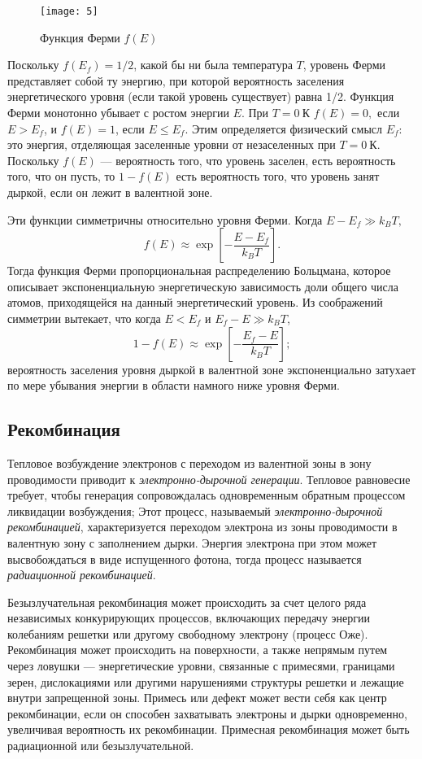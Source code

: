 \documentclass[a4paper, 12pt]{article}
\begin{document}
\begin{figure}[H]
    \texttt{[image: 5]} 
    \caption{Функция Ферми $f(E)$}
    \label{fig:5}
\end{figure}

Поскольку $f(E_{f}) = 1/2$, какой бы ни была температура $T$, уровень
Ферми представляет собой ту энергию, при которой вероятность заселения
энергетического уровня (если такой уровень существует) равна 1/2.
Функция Ферми монотонно убывает с ростом энергии $E$. При $T=0\: К$ 
$f(E)=0,$ если $E>E_{f}$, и $f(E)=1$, если $E\le E_{f}$. Этим
определяется физический смысл $E_{f}:$ это энергия, отделяющая
заселенные уровни от незаселенных при $T=0\: К$. Поскольку $f(E)$ ---
вероятность того, что уровень заселен, есть вероятность того, что он
пусть, то $1-f(E)$ есть вероятность того, что уровень занят дыркой,
если он лежит в валентной зоне. 

Эти функции симметричны относительно уровня Ферми. Когда $E-E_{f}\gg
k_{B}T,$
\[
    f(E)\approx \exp \left[- \frac{E-E_{f}}{k_{B}T}\right].
\]
Тогда функция Ферми пропорциональная распределению Больцмана, которое
описывает экспоненциальную энергетическую зависимость доли общего
числа атомов, приходящейся на данный энергетический уровень. Из
соображений симметрии вытекает, что когда $E<E_{f}$ и $E_{f}-E \gg
k_{B}T$,
\[
    1-f(E) \approx \exp \left[- \frac{E_{f}-E}{k_{B}T}\right];
\]
вероятность заселения уровня дыркой в валентной зоне экспоненциально
затухает по мере убывания энергии в области намного ниже уровня Ферми.

\subsection{Рекомбинация}
Тепловое возбуждение электронов с переходом из валентной зоны в зону
проводимости приводит к \emph{электронно-дырочной генерации}. Тепловое
равновесие требует, чтобы генерация сопровождалась одновременным
обратным процессом ликвидации возбуждения; Этот процесс, называемый
\emph{электронно-дырочной рекомбинацией}, характеризуется переходом
электрона из зоны проводимости в валентную зону с заполнением дырки.
Энергия электрона при этом может высвобождаться в виде испущенного
фотона, тогда процесс называется \emph{радиационной
рекомбинацией}.

Безызлучательная рекомбинация может происходить за счет целого ряда
независимых конкурирующих процессов, включающих передачу энергии
колебаниям решетки или другому свободному электрону (процесс Оже).
Рекомбинация может происходить на поверхности, а также непрямым путем
через ловушки --- энергетические уровни, связанные с примесями,
границами зерен, дислокациями или другими нарушениями структуры
решетки и лежащие внутри запрещенной зоны. Примесь или дефект может
вести себя как центр рекомбинации, если он способен захватывать
электроны и дырки одновременно, увеличивая вероятность их
рекомбинации. Примесная рекомбинация может быть радиационной или
безызлучательной. 
\end{document}
